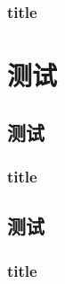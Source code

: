 \documentclass{fdu-doctorplan}
\begin{document}
\subsubsection{title}
\zhlipsum[1-3]

\section{测试}
\zhlipsum[1-3]
\subsection{测试}
\zhlipsum[1-3]
\subsubsection{title}
\zhlipsum[1-3]

\subsection{测试}
\zhlipsum[1-3]
\subsubsection{title}
\zhlipsum[1-3]
\end{document}
